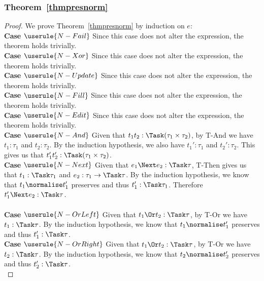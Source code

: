 \subsubsection{Theorem~\ref{thmpresnorm}}
\begin{proof}
  We prove Theorem~\ref{thmpresnorm} by induction on $e$:\\

  \noindent\textbf{Case} $\userule{N-Fail}$ Since this case does not alter the
  expression, the theorem holds trivially.\\

  \noindent\textbf{Case} $\userule{N-Xor}$ Since this case does not alter the
  expression, the theorem holds trivially.\\

  \noindent\textbf{Case} $\userule{N-Update}$ Since this case does not alter
  the expression, the theorem holds trivially.\\

  \noindent\textbf{Case} $\userule{N-Fill}$ Since this case does not alter the
  expression, the theorem holds trivially.\\

  \noindent\textbf{Case} $\userule{N-Edit}$ Since this case does not alter the
  expression, the theorem holds trivially.\\

  \noindent\textbf{Case} $\userule{N-And}$ Given that $t_1\And t_2:\Task(\tau_1\times\tau_2)$, by T-And we have $t_1:\tau_1$ and $t_2:\tau_2$. By the induction hypothesis, we also have $t_1':\tau_1$ and $t_2':\tau_2$. This gives us that $t_1'\And t_2':\Task(\tau_1\times\tau_2)$.\\

  \noindent\textbf{Case} $\userule{N-Next}$ Given that $e_1\Next e_2:\Task \tau$, T-Then gives us that $t_1:\Task\tau_1$
  and $e_2:\tau_1 \to \Task \tau$. By the induction hypothesis, we know that
  $t_1\normalise t_1'$ preserves and thus $t_1':\Task\tau_1$. Therefore
  $t_1'\Next e_2:\Task\tau$.\\\\

  \noindent\textbf{Case} $\userule{N-OrLeft}$ Given that $t_1\Or t_2:\Task\tau$,
  by T-Or we have $t_1:\Task\tau$. By the induction hypothesis, we know that
  $t_1\normalise t_1'$ preserves and thus $t_1':\Task\tau$.\\

  \noindent\textbf{Case} $\userule{N-OrRight}$ Given that $t_1\Or t_2:\Task\tau$,
  by T-Or we have $t_2:\Task\tau$. By the induction hypothesis, we know that
  $t_2\normalise t_2'$ preserves and thus $t_2':\Task\tau$. \\


\end{proof}
